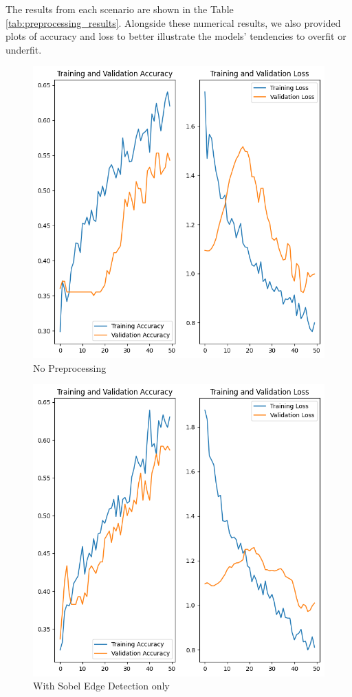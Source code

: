 The results from each scenario are shown in the Table \ref{tab:preprocessing_results}. Alongside these numerical results, we also provided plots of accuracy and loss to better illustrate the models' tendencies to overfit or underfit.

\begin{figure}[H]
  \includegraphics[width=\linewidth]{figures/without_preprocessing.png}
  \caption{No Preprocessing}
  \label{fig:no_preprocessing_plots}
\end{figure}

\begin{figure}[H]
  \includegraphics[width=\linewidth]{figures/training_validation_results.png}
  \caption{With Sobel Edge Detection only}
  \label{fig:sobel_edge_plots}
\end{figure}

